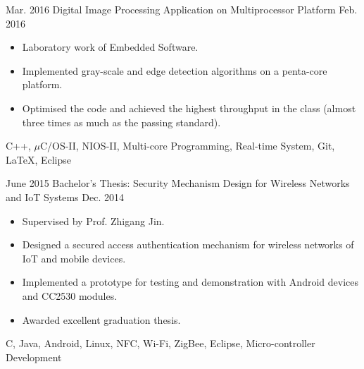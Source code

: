 \begin{projects}
  
  
  
  
  \project
  {Mar. 2016}       {Digital Image Processing Application on Multiprocessor Platform}
  {Feb. 2016}      {
                      \begin{itemize}
                       \item Laboratory work of Embedded Software.
						\item Implemented gray-scale and edge detection algorithms on a penta-core platform.
						\item Optimised the code and achieved the highest throughput in the class (almost three times as much as the passing standard).
                      \end{itemize}
                    }
                    {C++, $\mu$C/OS-II, NIOS-II, Multi-core Programming, Real-time System, Git, \LaTeX, Eclipse}
  \emptySeparator
  


  \project
  {June 2015}		{Bachelor's Thesis: Security Mechanism Design for Wireless Networks and IoT Systems}
  {Dec. 2014}		{
  	\begin{itemize}
  		\item Supervised by Prof. Zhigang Jin.
  		\item Designed a secured access authentication mechanism for wireless networks of IoT and mobile devices.
  		\item Implemented a prototype for testing and demonstration with Android devices and CC2530 modules.
  		\item Awarded excellent graduation thesis.
  	\end{itemize}
  }
  {C, Java, Android, Linux, NFC, Wi-Fi, ZigBee, Eclipse, Micro-controller Development}


\end{projects}
